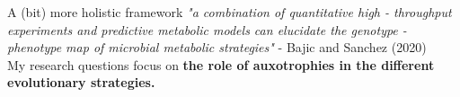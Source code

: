 \documentclass{beamer}
\begin{document}
\begin{darkframes}
\begin{frame}
      \begin{block}{A (bit) more holistic framework}
         \tiny
         \textit{
            "a combination of quantitative high - throughput experiments and predictive metabolic
            models can elucidate the genotype - phenotype map of microbial metabolic strategies"
         } - Bajic and Sanchez (2020) \\
         My research questions focus on 
         \textbf{
            the role of auxotrophies in the different evolutionary strategies.
         }
         
      \end{block}

   \end{frame}
   \end{darkframes}
\end{document}
